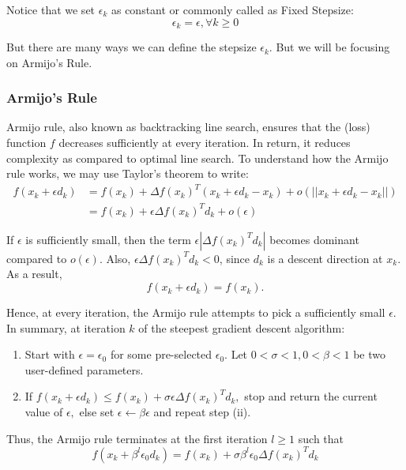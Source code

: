 \documentclass{article} %
\theoremstyle{definition}
\theoremstyle{remark}
\theoremstyle{plain}
\begin{document}
    Notice that we set \(\epsilon_k\) as constant or commonly called as Fixed Stepsize:
    \[\epsilon_k = \epsilon, \forall k \geq 0\]
    
    But there are many ways we can define the stepsize \(\epsilon_k\). But we will be focusing on Armijo's Rule.

    \subsubsection{Armijo's Rule}
    
    Armijo rule, also known as backtracking line search, ensures that the (loss) function \(f\) decreases sufficiently at every iteration. In return, it reduces complexity as compared to optimal line search. To understand how the Armijo rule works, we may use Taylor’s theorem to write:
    \begin{align*}
        f(x_k + \epsilon d_k) &= f(x_k) + \Delta f(x_k)^T(x_k + \epsilon d_k - x_k) + o(||x_k + \epsilon d_k - x_k||)\\
        &= f(x_k) + \epsilon \Delta f(x_k)^T d_k + o(\epsilon)
    \end{align*} 

    If \(\epsilon\) is sufficiently small, then the term \(\epsilon |\Delta f(x_k)^T d_k|\) becomes dominant compared to \(o(\epsilon)\). Also, \(\epsilon \Delta f(x_k)^T d_k < 0\), since \(d_k\) is a descent direction at \(x_k\). As a result,
    \[f(x_k + \epsilon d_k) = f(x_k).\]

    Hence, at every iteration, the Armijo rule attempts to pick a sufficiently small \(\epsilon\). In summary, at iteration \(k\) of the steepest gradient descent algorithm:

    \begin{enumerate}[label=(\roman*)]
        \item Start with \(\epsilon = \epsilon_0\) for some pre-selected \(\epsilon_0\). Let \(0 < \sigma < 1, 0<\beta<1\) be two user-defined parameters.
        \item If \(f(x_k + \epsilon d_k) \leq f(x_k) + \sigma \epsilon \Delta f(x_k)^T d_k,\) stop and return the current value of \(\epsilon,\) else set \(\epsilon \leftarrow  \beta \epsilon \) and repeat step (ii).
    \end{enumerate}

    Thus, the Armijo rule terminates at the first iteration \(l \geq 1\)  such that
    \[f(x_k + \beta^l\epsilon_0 d_k) = f(x_k) + \sigma \beta^l \epsilon_0 \Delta f(x_k)^T d_k\]
\end{document}
